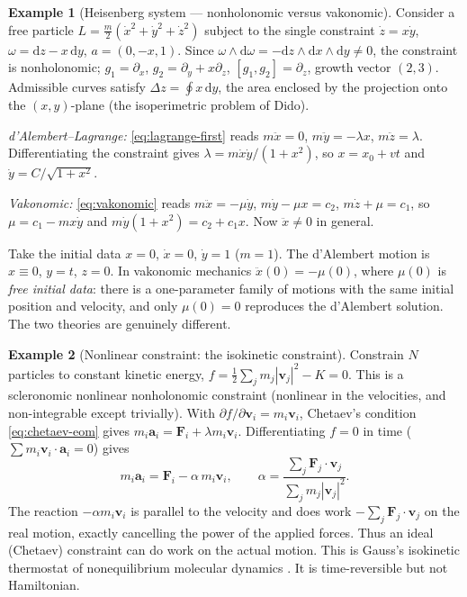 \documentclass[11pt,a4paper]{article}
\theoremstyle{definition}
\newtheorem{example}{Example}[section]
\theoremstyle{plain}
\theoremstyle{remark}
\newcommand{\dd}{\mathrm{d}}
\begin{document}
\begin{example}[Heisenberg system --- nonholonomic versus vakonomic]\label{ex:heisenberg}
Consider a free particle $L=\tfrac m2(\dot x^2+\dot y^2+\dot z^2)$ subject to the single
constraint $\dot z=x\dot y$, $\omega=\dd z-x\,\dd y$, $a=(0,-x,1)$. Since $\omega\wedge\dd\omega=-\dd z\wedge\dd x\wedge\dd y\neq0$,
the constraint is nonholonomic; $g_1=\partial_x$, $g_2=\partial_y+x\partial_z$, $[g_1,g_2]=\partial_z$,
growth vector $(2,3)$. Admissible curves satisfy $\Delta z=\oint x\,\dd y$, the area enclosed by the projection
onto the $(x,y)$-plane (the isoperimetric problem of Dido).

\emph{d'Alembert--Lagrange:} \eqref{eq:lagrange-first} reads $m\ddot x=0$, $m\ddot y=-\lambda x$,
$m\ddot z=\lambda$. Differentiating the constraint gives $\lambda=m\dot x\dot y/(1+x^2)$, so
$x=x_0+vt$ and $\dot y=C/\sqrt{1+x^2}$.

\emph{Vakonomic:} \eqref{eq:vakonomic} reads $m\ddot x=-\mu\dot y$, $m\dot y-\mu x=c_2$, $m\dot z+\mu=c_1$, so
$\mu=c_1-mx\dot y$ and $m\dot y(1+x^2)=c_2+c_1x$. Now $\ddot x\neq0$ in general.

Take the initial data $x=0$, $\dot x=0$, $\dot y=1$ ($m=1$). The d'Alembert motion is $x\equiv0$, $y=t$,
$z=0$. In vakonomic mechanics $\ddot x(0)=-\mu(0)$, where $\mu(0)$ is \emph{free initial
data}: there is a one-parameter family of motions with the same initial position and velocity,
and only $\mu(0)=0$ reproduces the d'Alembert solution. The two theories are genuinely different.
\end{example}

\begin{example}[Nonlinear constraint: the isokinetic constraint]\label{ex:isokinetic}
Constrain $N$ particles to constant kinetic energy,
$f=\tfrac12\sum_jm_j|\mathbf v_j|^2-K=0$. This is a scleronomic nonlinear
nonholonomic constraint (nonlinear in the velocities, and non-integrable except trivially). With $\partial f/\partial\mathbf v_i=m_i\mathbf v_i$,
Chetaev's condition \eqref{eq:chetaev-eom} gives $m_i\mathbf a_i=\mathbf F_i+\lambda m_i\mathbf v_i$.
Differentiating $f=0$ in time ($\sum m_i\mathbf v_i\cdot\mathbf a_i=0$) gives
\[
  m_i\mathbf a_i=\mathbf F_i-\alpha\,m_i\mathbf v_i,\qquad
  \alpha=\frac{\sum_j\mathbf F_j\cdot\mathbf v_j}{\sum_jm_j|\mathbf v_j|^2}.
\]
The reaction $-\alpha m_i\mathbf v_i$ is parallel to the velocity and does work
$-\sum_j\mathbf F_j\cdot\mathbf v_j$ on the real motion, exactly cancelling the power of the applied forces.
Thus an ideal (Chetaev) constraint can do work on the actual motion. This is Gauss's isokinetic
thermostat of nonequilibrium molecular dynamics \cite{EvansMorriss1990}. It is time-reversible but not Hamiltonian.
\end{example}
\end{document}
